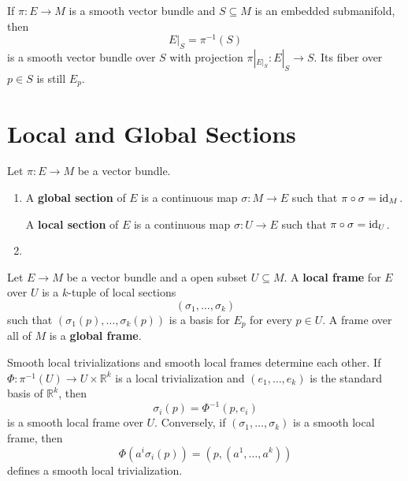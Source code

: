 \documentclass[12pt, oneside]{book}
\begin{document}
\begin{example}[Restriction]
    If $\pi:E\rightarrow M$ is a smooth vector bundle and $S\subseteq M$ is an embedded submanifold, then
    \[
        E|_S=\pi^{-1}(S)
    \]
    is a smooth vector bundle over $S$ with projection $\pi|_{E|_S}:E|_S\rightarrow S$. Its fiber over $p\in S$ is still $E_p$.
\end{example}

\section{Local and Global Sections}

\begin{definition}
    Let $\pi:E\rightarrow M$ be a vector bundle.
    \begin{enumerate}
        \item
              A \textbf{global section} of $E$ is a continuous map
              $\sigma:M\rightarrow E$
              such that $\pi\circ\sigma=\operatorname{\operatorname{id}}_M$.

              A \textbf{local section} of $E$ is a continuous map
              $\sigma:U\rightarrow E$
              such that $\pi\circ\sigma=\operatorname{\operatorname{id}}_U$.

        \item

    \end{enumerate}
\end{definition}



\begin{definition}
    Let $E\rightarrow M$ be a vector bundle and a open subset $U\subseteq M$. A \textbf{local frame} for $E$ over $U$ is a $k$-tuple of local sections
    \[
        (\sigma_1,\ldots,\sigma_k)
    \]
    such that $\left(\sigma_1(p),\ldots,\sigma_k(p)\right)$ is a basis for $E_p$ for every $p\in U$. A frame over all of $M$ is a \textbf{global frame}.
\end{definition}

\begin{proposition}
    Smooth local trivializations and smooth local frames determine each other.
    If $\Phi:\pi^{-1}(U)\rightarrow U\times\mathbb{R}^k$ is a local trivialization and $(e_1,\ldots,e_k)$ is the standard basis of $\mathbb{R}^k$, then
    \[
        \sigma_i(p)=\Phi^{-1}(p,e_i)
    \]
    is a smooth local frame over $U$. Conversely, if $(\sigma_1,\ldots,\sigma_k)$ is a smooth local frame, then
    \[
        \Phi\left(a^i\sigma_i(p)\right)=(p,(a^1,\ldots,a^k))
    \]
    defines a smooth local trivialization.
\end{proposition}
\end{document}
